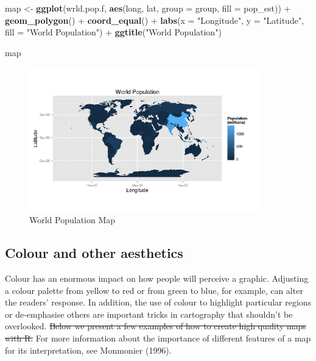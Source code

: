 \documentclass[]{article}
\newenvironment{Shaded}{}{}
\newcommand{\KeywordTok}[1]{\textcolor[rgb]{0.00,0.44,0.13}{\textbf{{#1}}}}
\newcommand{\DataTypeTok}[1]{\textcolor[rgb]{0.56,0.13,0.00}{{#1}}}
\newcommand{\StringTok}[1]{\textcolor[rgb]{0.25,0.44,0.63}{{#1}}}
\newcommand{\NormalTok}[1]{{#1}}
\let\Oldincludegraphics\includegraphics
\renewcommand{\includegraphics}[1]{\Oldincludegraphics[width=10cm]{#1}}
\providecommand{\DIFdel}[1]{{\protect\color{red}\sout{#1}}}                      %
\providecommand{\DIFdelbegin}{} %
\providecommand{\DIFdelend}{} %
\begin{document}
\begin{Shaded}
\begin{Highlighting}[]
\NormalTok{map <- }\KeywordTok{ggplot}\NormalTok{(wrld.pop.f, }\KeywordTok{aes}\NormalTok{(long, lat, }\DataTypeTok{group =} \NormalTok{group, }\DataTypeTok{fill =} \NormalTok{pop_est)) + }\KeywordTok{geom_polygon}\NormalTok{() + }
    \KeywordTok{coord_equal}\NormalTok{() + }\KeywordTok{labs}\NormalTok{(}\DataTypeTok{x =} \StringTok{"Longitude"}\NormalTok{, }\DataTypeTok{y =} \StringTok{"Latitude"}\NormalTok{, }\DataTypeTok{fill =} \StringTok{"World Population"}\NormalTok{) + }
    \KeywordTok{ggtitle}\NormalTok{(}\StringTok{"World Population"}\NormalTok{)}

\NormalTok{map}
\end{Highlighting}
\end{Shaded}
\begin{figure}[htbp]
\centering
\includegraphics{figure/World_Population_Map.png}
\caption{World Population Map}
\end{figure}

\DIFdelbegin \subsection{{Colour and other aesthetics}}
\addtocounter{subsection}{-1}%

\DIFdelend Colour has an enormous impact on how people will perceive a graphic.
Adjusting a colour palette from yellow to red or from green to blue, for
example, can alter the readers' response. In addition, the use of colour
to highlight particular regions or de-emphasise others are important
tricks in cartography that shouldn't be overlooked. \DIFdelbegin \DIFdel{Below we present a
few examples of how to create high quality maps with R. }\DIFdelend For more
information about the importance of different features of a map for its
interpretation, see Monmonier (1996).
\end{document}
